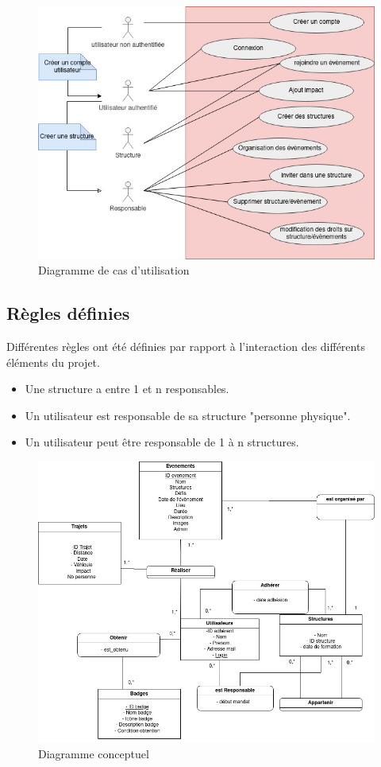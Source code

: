 \begin{figure}[h]
    \centering
    \includegraphics[width=0.8\linewidth]{pictures/use_case_pfa.jpg}
    \caption{Diagramme de cas d'utilisation}
    \label{fig:diag_use_case}
\end{figure}




\subsection{Règles définies}
Différentes règles ont été définies par rapport à l'interaction des différents éléments du projet.
\begin{itemize}
    \item Une structure a entre 1 et n responsables.
    \item Un utilisateur est responsable de sa structure "personne physique".
    \item Un utilisateur peut être responsable de 1 à n structures.
\end{itemize}

\begin{figure}
    \centering
    \includegraphics[width=1.1\linewidth]{pictures/diag_concept.jpg}
    \caption{Diagramme conceptuel}
    \label{fig:diag_concept}
\end{figure}

